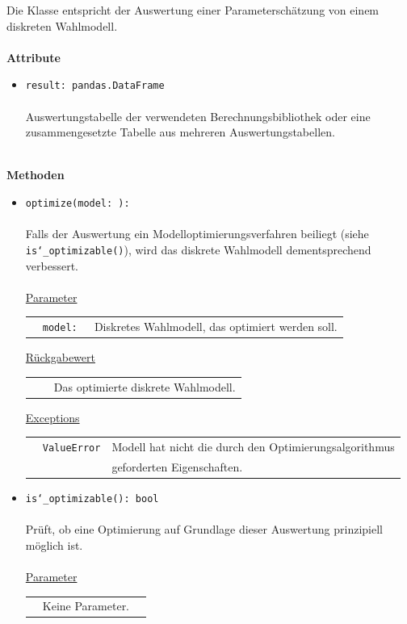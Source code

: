 \documentclass{article}
\newcommand{\classref}[1]{\texttt{\nameref{cls:#1}}}
\begin{document}
Die Klasse entspricht der Auswertung einer Parameterschätzung von einem diskreten Wahlmodell.
\\\\

\textbf{Attribute}
\begin{itemize}\setlength\itemsep{3em}
\item \texttt{result: pandas.DataFrame}\\\\
Auswertungstabelle der verwendeten Berechnungsbibliothek oder eine zusammengesetzte Tabelle aus mehreren Auswertungstabellen.
\\\\
\end{itemize}

\textbf{Methoden}
\begin{itemize}\setlength\itemsep{3em}
\item \texttt{optimize(model: \classref{Model}): \classref{Model}}\\\\
Falls der Auswertung ein Modelloptimierungsverfahren beiliegt (siehe \texttt{is\char`_optimizable()}), wird das diskrete Wahlmodell dementsprechend verbessert.\\\\
\underline{Parameter}\\
\begin{tabular}{lll}
 & \texttt{model: \classref{Model}} & Diskretes Wahlmodell, das optimiert werden soll.\\
\end{tabular}

\underline{Rückgabewert}\\
\begin{tabular}{lll}
 & \classref{Model} & Das optimierte diskrete Wahlmodell.\\
\end{tabular}

\underline{Exceptions}\\
\begin{tabular}{lll}
 & \texttt{ValueError} & Modell hat nicht die durch den Optimierungsalgorithmus\\
 && geforderten Eigenschaften.\\
\end{tabular}

\item \texttt{is\char`_optimizable(): bool}\\\\
Prüft, ob eine Optimierung auf Grundlage dieser Auswertung prinzipiell möglich ist.\\\\
\underline{Parameter}\\
\begin{tabular}{lll}
 & Keine Parameter.
\end{tabular}


\end{itemize}
\end{document}

